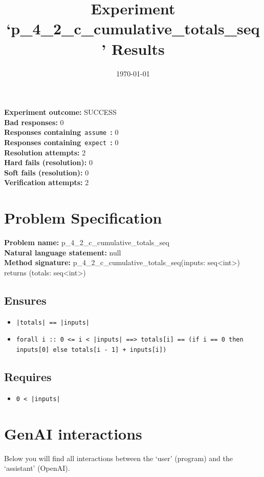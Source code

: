 \documentclass{article}
\begin{document}
\title{Experiment `p\_4\_2\_c\_cumulative\_totals\_seq' Results}
\author{\today}
\date{}
\maketitle
\textbf{Experiment outcome: }SUCCESS
\\\textbf{Bad responses: }0
\\\textbf{Responses containing}~\texttt{assume}~\textbf{: }0
\\\textbf{Responses containing}~\texttt{expect}~\textbf{: }0
\\\textbf{Resolution attempts: }2
\\\textbf{Hard fails (resolution): }0
\\\textbf{Soft fails (resolution): }0
\\\textbf{Verification attempts: }2
\section*{Problem Specification}
\textbf{Problem name: }p\_4\_2\_c\_cumulative\_totals\_seq
\\\textbf{Natural language statement: }null
\\\textbf{Method signature: }p\_4\_2\_c\_cumulative\_totals\_seq(inputs: seq<int>) returns (totals: seq<int>)
\subsection*{Ensures}
\begin{itemize}
\item \texttt{|totals| == |inputs|}
\item \texttt{forall i :: 0 <= i < |inputs| ==> totals[i] == (if i == 0 then inputs[0] else totals[i - 1] + inputs[i])}
\end{itemize}
\subsection*{Requires}
\begin{itemize}
\item \texttt{0 < |inputs|}
\end{itemize}
\clearpage
\section*{GenAI interactions}
Below you will find all interactions between the `user' (program) and the `assistant' (OpenAI).
\end{document}
